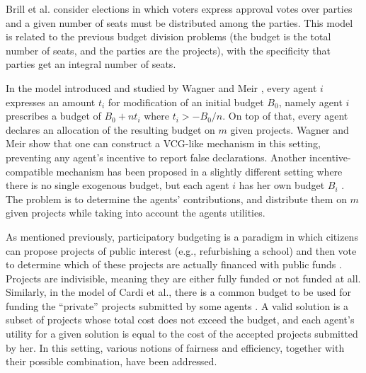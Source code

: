 Brill et al. \cite{BGPSW24} consider elections in which voters express approval votes over parties and a given number of seats must be distributed among the parties. This model is related to the previous budget division problems (the budget is the total number of seats, and the parties are the projects), with the specificity that parties get an integral number of seats. 





In the model introduced and studied by Wagner and Meir \cite{WagnerM23}, every agent $i$ expresses an amount $t_i$ for modification of an initial budget $B_0$, namely agent $i$ prescribes a budget of $B_0+n t_i$ where $t_i >-B_0/n$. On top of that, every agent declares an allocation of the resulting budget on $m$ given projects. Wagner and Meir show that one can construct a VCG-like mechanism in this setting, preventing any agent's incentive to report false declarations. Another incentive-compatible mechanism has been proposed in a slightly different setting where there is no single exogenous budget, but each agent $i$ has her own budget $B_i$ \cite{BRANDL2022102585}. The problem is to determine the agents’ contributions, and %
distribute them on $m$ given projects while taking into account the agents utilities. 



As mentioned previously, participatory budgeting is a %
paradigm in which citizens can propose projects of public interest (e.g., refurbishing a school) and then vote to determine which of these projects are actually financed with public funds \cite{AS21,de2022international}. Projects are indivisible, meaning they are either fully funded or not funded at all. Similarly, in the model of Cardi et al., there is a common budget to be used for funding the ``private'' projects submitted by some agents  \cite{CGL21,CGL22}. A valid solution is a subset of projects whose total cost does not exceed the budget, and each agent's utility for a given solution is equal to the cost of the accepted projects submitted by her. In this setting, various notions of fairness and efficiency, together with their possible combination, have been addressed. 




